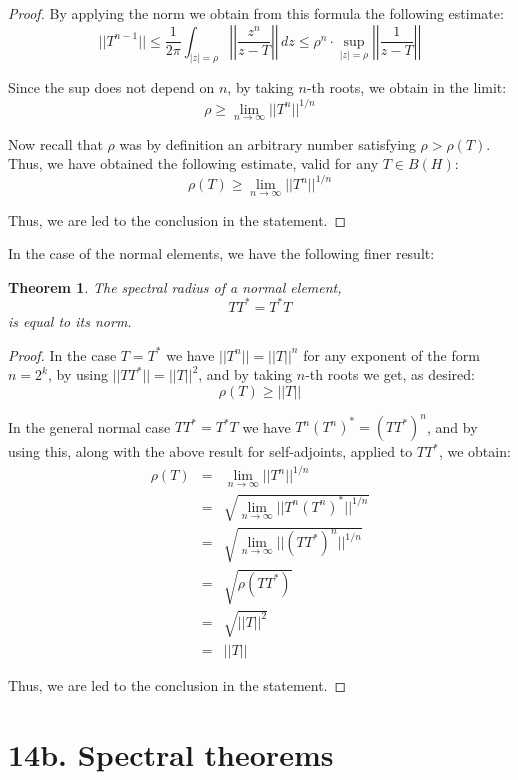 \documentclass[12pt]{amsbook}
\newtheorem{theorem}{Theorem}[chapter]
\begin{document}
\begin{proof}
By applying the norm we obtain from this formula the following estimate:
$$||T^{n-1}||
\leq\frac{1}{2\pi}\int_{|z|=\rho}\left|\left|\frac{z^n}{z-T}\right|\right|\,dz
\leq\rho^n\cdot\sup_{|z|=\rho}\left|\left|\frac{1}{z-T}\right|\right|$$

Since the sup does not depend on $n$, by taking $n$-th roots, we obtain in the limit:
$$\rho\geq\lim_{n\to\infty}||T^n||^{1/n}$$

Now recall that $\rho$ was by definition an arbitrary number satisfying $\rho>\rho(T)$. Thus, we have obtained the following estimate, valid for any $T\in B(H)$:
$$\rho(T)\geq\lim_{n\to\infty}||T^n||^{1/n}$$

Thus, we are led to the conclusion in the statement.
\end{proof}

In the case of the normal elements, we have the following finer result:


\begin{theorem}
The spectral radius of a normal element,
$$TT^*=T^*T$$
is equal to its norm.
\end{theorem}

\begin{proof}
In the case $T=T^*$ we have $||T^n||=||T||^n$ for any exponent of the form $n=2^k$, by using $||TT^*||=||T||^2$, and by taking $n$-th roots we get, as desired:
$$\rho(T)\geq||T||$$

In the general normal case $TT^*=T^*T$ we have $T^n(T^n)^*=(TT^*)^n$, and by using this, along with the above result for self-adjoints, applied to $TT^*$, we obtain:
\begin{eqnarray*}
\rho(T)
&=&\lim_{n\to\infty}||T^n||^{1/n}\\
&=&\sqrt{\lim_{n\to\infty}||T^n(T^n)^*||^{1/n}}\\
&=&\sqrt{\lim_{n\to\infty}||(TT^*)^n||^{1/n}}\\
&=&\sqrt{\rho(TT^*)}\\
&=&\sqrt{||T||^2}\\
&=&||T||
\end{eqnarray*}

Thus, we are led to the conclusion in the statement.
\end{proof}

\section*{14b. Spectral theorems}
\end{document}
